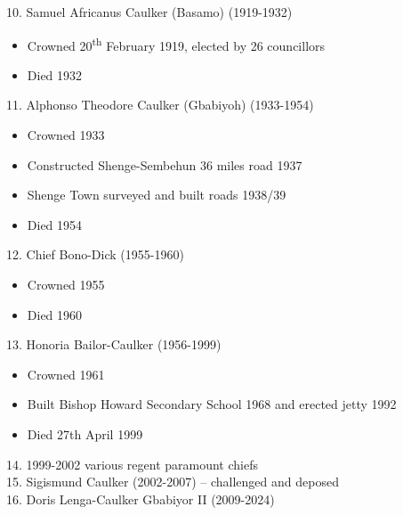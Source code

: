10. Samuel Africanus Caulker (Basamo) (1919-1932)
\begin{itemize}
\item Crowned 20\textsuperscript{th}  {February 1919}, elected by 26 councillors
\item Died 1932
\end{itemize}

11. Alphonso Theodore Caulker (Gbabiyoh) (1933-1954)
\begin{itemize}
\item Crowned 1933
\item Constructed Shenge-Sembehun 36 miles road 1937
\item Shenge Town surveyed and built roads 1938/39
\item Died 1954
\end{itemize}

12. Chief Bono-Dick (1955-1960)
\begin{itemize}
\item Crowned 1955
\item Died 1960
\end{itemize}

13. Honoria Bailor-Caulker (1956-1999)
\begin{itemize}
\item Crowned 1961
\item Built Bishop Howard Secondary School 1968 and erected jetty 1992
\item Died 27th April 1999
\end{itemize}


14. 1999-2002 various regent paramount chiefs\\
15. Sigismund Caulker (2002-2007) – challenged and deposed\\
16. Doris Lenga-Caulker Gbabiyor II (2009-2024)

